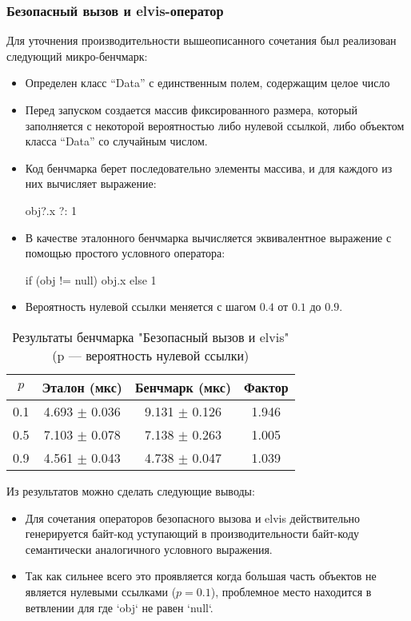 \subsubsection{Безопасный вызов и elvis-оператор}
\label{section:elvis:bm}
Для уточнения производительности вышеописанного сочетания был реализован следующий микро-бенчмарк:
\begin{itemize}
    \item Определен класс ``Data'' с единственным полем, содержащим целое число
    \item Перед запуском создается массив фиксированного размера, который заполняется с некоторой
    вероятностью либо нулевой ссылкой, либо объектом класса ``Data'' со случайным числом.
    \item Код бенчмарка берет последовательно элементы массива, и для каждого из них
    вычисляет выражение:
    \begin{pyglist}[language=kotlin]
    obj?.x ?: 1
    \end{pyglist}
    \item В качестве эталонного бенчмарка вычисляется эквивалентное выражение с помощью простого
    условного оператора:
    \begin{pyglist}[language=kotlin]
    if (obj != null) obj.x else 1
    \end{pyglist}

    \item Вероятность нулевой ссылки меняется с шагом $0.4$ от $0.1$ до $0.9$.
\end{itemize}

\begin{table}[h]
\begin{center}
\begin{tabular}{|c|c|c|c|} \hline
$p$ & Эталон (мкс) & Бенчмарк (мкс) & Фактор \\ \hline
0.1 & 4.693 $\pm$ 0.036 & 9.131 $\pm$ 0.126 & 1.946\\ \hline
0.5 & 7.103 $\pm$ 0.078 & 7.138 $\pm$ 0.263 & 1.005\\ \hline
0.9 & 4.561 $\pm$ 0.043 & 4.738 $\pm$ 0.047 & 1.039\\ \hline
\end{tabular}
\caption{Результаты бенчмарка "Безопасный вызов и elvis" \newline (p --- вероятность нулевой ссылки)}
\end{center}
\end{table}

Из результатов можно сделать следующие выводы:
\begin{itemize}
    \item Для сочетания операторов безопасного вызова и elvis действительно генерируется байт-код
    уступающий в производительности байт-коду семантически аналогичного условного выражения.

    \item Так как сильнее всего это проявляется когда большая часть объектов не является нулевыми
    ссылками ($p = 0.1$), проблемное место находится в ветвлении для где `obj` не равен `null`.
\end{itemize}

